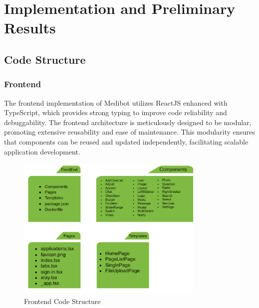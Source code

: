 
\chapter{Implementation and Preliminary Results}

\section{Code Structure}

\subsection{Frontend}
The frontend implementation of Medibot utilizes ReactJS enhanced with TypeScript, which provides strong typing to improve code reliability and debuggability. The frontend architecture is meticulously designed to be modular, promoting extensive reusability and ease of maintenance. This modularity ensures that components can be reused and updated independently, facilitating scalable application development.

\begin{figure}[H]
    \centering
    \includegraphics[width=0.8\textwidth]{./Figures/FrontendCodeStructure.png}
    \caption{Frontend Code Structure}
    \label{fig:frontend_code_structure}
\end{figure}

